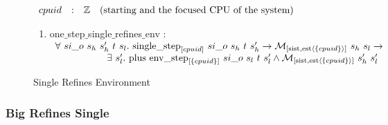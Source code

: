 \begin{figure}

$
\begin{array}{lllr}
cpuid & : & \ztype &  \mbox{(starting and the focused CPU of the system)}\\
\end{array}
$

\begin{mathpar}
\end{mathpar}

\begin{enumerate}
\item one$\_$step$\_$single$\_$refines$\_$env : \\
$
\begin{array}{l}
\forall \ si\_o \ s_h \ s_h' \ t \ s_l . \ \singlestep{cpuid}{si\_o}{s_h}{t}{s_h'} \rightarrow  \matchsinglestatestate{\set{cpuid}}{s_h}{s_l} \rightarrow \\
\ \ \ \ \ \ \ \ \ \ \ \ \ \ \ \ \exists\ s_l' . \  \ccplusstep{\envstep{\set{cpuid}}{si\_o}{s_l}{t}{s_l'}} \wedge  \matchsinglestatestate{\set{cpuid}}{s_h'}{s_l'}\\
\end{array}
$
\end{enumerate}

\caption{Single Refines Environment}
\label{fig:single-refines-env}
\end{figure}

\clearpage

\subsubsection{Big Refines Single}
\label{subsubsec:big-refines-single}

